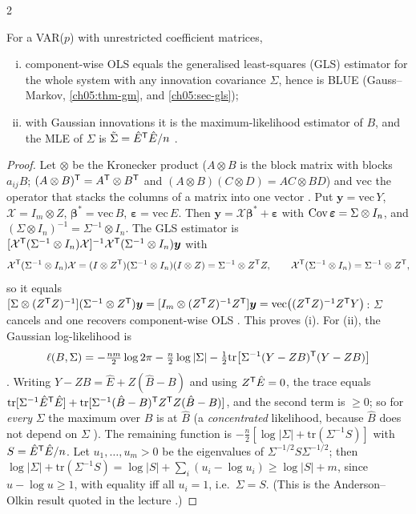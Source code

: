 \begin{paracol}{2}
\begin{theorem}\label{ch09:thm-varols}
For a VAR($p$) with unrestricted coefficient matrices,
\begin{enumerate}[(i)]
  \item component-wise OLS equals the generalised least-squares (GLS) estimator for the
      whole system with any innovation covariance $\Sigma$, hence is BLUE (Gauss--Markov, \cref{ch05:thm-gm}, and \cref{ch05:sec-gls});
  \item with Gaussian
      innovations it is the maximum-likelihood estimator of $B$, and the MLE of $\Sigma$ is $\tilde\Sigma=\hat E^{\mathsf T}\hat E/n$
      .
\end{enumerate}
\end{theorem}
\begin{proof}
Let $\otimes$ be the Kronecker product ($A\otimes B$ is the block matrix with blocks $a_{ij}B$; $(A\otimes B)^{\mathsf T}=A^{\mathsf T}\otimes B^{\mathsf T}$ and
$(A\otimes B)(C\otimes D)=AC\otimes BD$) and $\mathrm{vec}$ the operator that stacks the columns of a matrix into one vector
. Put $\bm y=\mathrm{vec}\,Y$, $\mathcal X=I_m\otimes Z$, $\bm\beta^*=\mathrm{vec}\,B$,
$\bm\varepsilon=\mathrm{vec}\,E$. Then $\bm y=\mathcal X\bm\beta^*+\bm\varepsilon$ with $\operatorname{Cov}\bm\varepsilon=\Sigma\otimes I_n$, and
$(\Sigma\otimes I_n)^{-1}=\Sigma^{-1}\otimes I_n$. The GLS estimator is
$[\mathcal X^{\mathsf T}(\Sigma^{-1}\otimes I_n)\mathcal X]^{-1}\mathcal X^{\mathsf T}(\Sigma^{-1}\otimes I_n)\bm y$ with
\[
  \mathcal X^{\mathsf T}(\Sigma^{-1}\otimes I_n)\mathcal X=(I\otimes Z^{\mathsf T})(\Sigma^{-1}\otimes I_n)(I\otimes Z)=\Sigma^{-1}\otimes Z^{\mathsf T} Z,\qquad
  \mathcal X^{\mathsf T}(\Sigma^{-1}\otimes I_n)=\Sigma^{-1}\otimes Z^{\mathsf T} ,
\]
so it equals $[\Sigma\otimes(Z^{\mathsf T} Z)^{-1}](\Sigma^{-1}\otimes Z^{\mathsf T})\bm y=[I_m\otimes(Z^{\mathsf T} Z)^{-1}Z^{\mathsf T}]\bm y=\mathrm{vec}\bigl((Z^{\mathsf T} Z)^{-1}Z^{\mathsf T} Y\bigr)$:
$\Sigma$ cancels and one recovers component-wise OLS . This proves (i).
For (ii), the Gaussian log-likelihood is
\[
  \ell(B,\Sigma)=-\tfrac{nm}2\log2\pi-\tfrac n2\log|\Sigma|-\tfrac12\mathrm{tr}\bigl[\Sigma^{-1}(Y-ZB)^{\mathsf T}(Y-ZB)\bigr]
\]
. Writing $Y-ZB=\hat E+Z(\hat B-B)$ and using $Z^{\mathsf T}\hat E=0$, the trace equals
$\mathrm{tr}[\Sigma^{-1}\hat E^{\mathsf T}\hat E]+\mathrm{tr}[\Sigma^{-1}(\hat B-B)^{\mathsf T} Z^{\mathsf T} Z(\hat B-B)]$, and the second term is $\ge0$; so for \emph{every}
$\Sigma$ the maximum over $B$ is at $\hat B$ (a \emph{concentrated} likelihood, because $\hat B$ does not depend on $\Sigma$
). The remaining function is $-\frac n2[\log|\Sigma|+\mathrm{tr}(\Sigma^{-1}S)]$ with
$S=\hat E^{\mathsf T}\hat E/n$. Let $u_1,\dots,u_m>0$ be the eigenvalues of $\Sigma^{-1/2}S\Sigma^{-1/2}$; then
$\log|\Sigma|+\mathrm{tr}(\Sigma^{-1}S)=\log|S|+\sum_i(u_i-\log u_i)\ge\log|S|+m$, since $u-\log u\ge1$, with equality iff all $u_i=1$,
i.e.\ $\Sigma=S$. (This is the Anderson--Olkin result quoted in the lecture .)
\end{proof}


\end{paracol}
